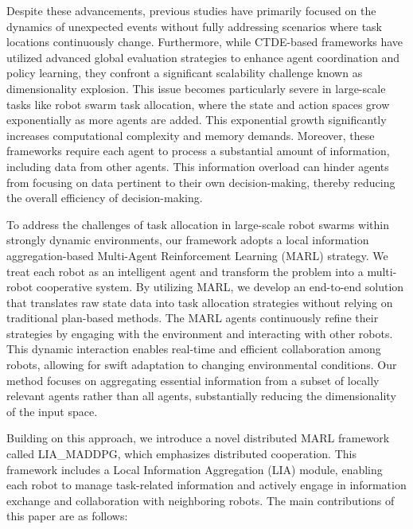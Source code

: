 \documentclass[lettersize,journal]{IEEEtran}
\begin{document}
Despite these advancements, previous studies have primarily focused on the dynamics of unexpected events without fully addressing scenarios where task locations continuously change. Furthermore, while CTDE-based frameworks have utilized advanced global evaluation strategies to enhance agent coordination and policy learning, they confront a significant scalability challenge known as dimensionality explosion. This issue becomes particularly severe in large-scale tasks like robot swarm task allocation, where the state and action spaces grow exponentially as more agents are added. This exponential growth significantly increases computational complexity and memory demands. Moreover, these frameworks require each agent to process a substantial amount of information, including data from other agents. This information overload can hinder agents from focusing on data pertinent to their own decision-making, thereby reducing the overall efficiency of decision-making.

To address the challenges of task allocation in large-scale robot swarms within strongly dynamic environments, our framework adopts a local information aggregation-based Multi-Agent Reinforcement Learning (MARL) strategy. We treat each robot as an intelligent agent and transform the problem into a multi-robot cooperative system. By utilizing MARL, we develop an end-to-end solution that translates raw state data into task allocation strategies without relying on traditional plan-based methods. The MARL agents continuously refine their strategies by engaging with the environment and interacting with other robots. This dynamic interaction enables real-time and efficient collaboration among robots, allowing for swift adaptation to changing environmental conditions. Our method focuses on aggregating essential information from a subset of locally relevant agents rather than all agents, substantially reducing the dimensionality of the input space.

Building on this approach, we introduce a novel distributed MARL framework called LIA\_MADDPG, which emphasizes distributed cooperation. This framework includes a Local Information Aggregation (LIA) module, enabling each robot to manage task-related information and actively engage in information exchange and collaboration with neighboring robots. The main contributions of this paper are as follows:
\end{document}
